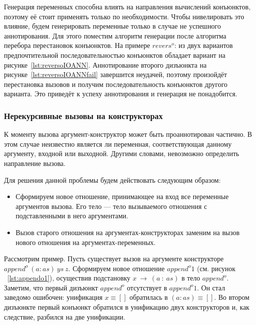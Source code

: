 Генерация переменных способна влиять на направления вычислений конъюнктов, поэтому её стоит применять только по необходимости.
Чтобы нивелировать это влияние, будем генерировать переменные только в случае не успешного аннотирования.
Для этого поместим алгоритм генерации после алгоритма перебора перестановок конъюнктов.
На примере $revers^o$: из двух вариантов предпочтительной последовательностью конъюнктов обладает вариант на рисунке~\ref{lst:reversoIOANN}.
Аннотирование второго дизъюнкта на рисунке~\ref{lst:reversoIOANNfail} завершится неудачей, поэтому произойдёт перестановка вызовов и получим последовательность конъюнктов другого варианта.
Это приведёт к успеху аннотирования и генерация не понадобится.


\subsubsection{Нерекурсивные вызовы на конструкторах}

К моменту вызова аргумент-конструктор может быть проаннотирован частично.
В этом случае неизвестно является ли переменная, соответствующая данному аргументу, входной или выходной.
Другими словами, невозможно определить направление вызова.

Для решения данной проблемы будем действовать следующим образом:
\begin{itemize}
    \item Сформируем новое отношение, принимающее на вход все переменные аргументов вызова. Его тело --- тело вызываемого отношения с подставленными в него аргументами.
    \item Вызов старого отношения на аргументах-конструкторах заменим на вызов нового отношения на аргументах-переменных. 
\end{itemize}

Рассмотрим пример.
Пусть существует вызов на аргументе конструкторе $append^o~(a : as)~ys~z$.
Сформируем новое отношение $append^o1$ (см. рисунок ~\ref{lst:appendo1}), осуществив подстановку $x~\rightarrow~(a~:~as)$ в тело $append^o$.
Заметим, что первый дизъюнкт $append^o$ отсутствует в $append^o1$.
Он стал заведомо ошибочен: унификация $x \equiv []$ обратилась в $(a : as) \equiv []$.
Во втором дизъюнкте первый конъюнкт обратился в унификацию двух конструкторов и, как следствие, разбился на две унификации.

